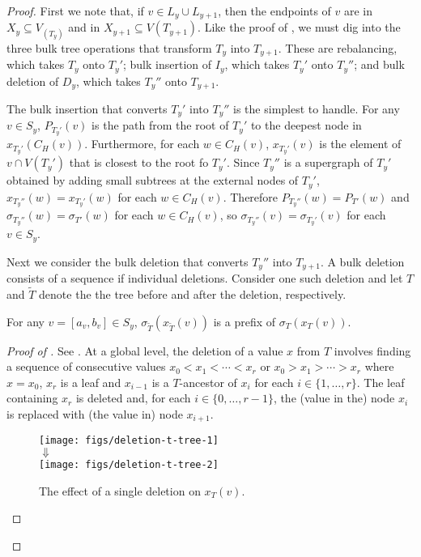 \documentclass[kpfonts]{patmorin}
\begin{document}
\begin{proof}
  First we note that, if $v\in L_y\cup L_{y+1}$, then the endpoints of $v$ are in $X_y\subseteq V_(T_y)$ and in $X_{y+1}\subseteq V(T_{y+1})$.
  Like the proof of , we must dig into the three bulk tree operations that transform $T_y$ into $T_{y+1}$. These are rebalancing, which takes $T_y$ onto $T_y'$; bulk insertion of $I_y$, which takes $T_y'$ onto $T_y''$; and bulk deletion of $D_y$, which takes $T_y''$ onto $T_{y+1}$.
  
  The bulk insertion that converts $T_y'$ into $T_y''$ is the simplest to handle.  For any $v\in S_y$, $P_{T_y'}(v)$ is the path from the root of $T_y'$ to the deepest node in $x_{T_y'}(C_H(v))$.  Furthermore, for each $w\in C_H(v)$, $x_{T_y'}(v)$ is the element of $v\cap V(T_y')$ that is closest to the root fo $T_y'$. Since $T_y''$ is a supergraph of $T_y'$ obtained by adding small subtrees at the external nodes of $T_y'$, $x_{T_y''}(w)=x_{T_y'}(w)$ for each $w\in C_H(v)$.  Therefore $P_{T_y''}(w)=P_{T'}(w)$ and $\sigma_{T_y''}(w)=\sigma_{T'}(w)$ for each $w\in C_H(v)$, so $\sigma_{T_y''}(v)=\sigma_{T_y'}(v)$ for each $v\in S_y$.
  
  Next we consider the bulk deletion that converts $T_y''$ into $T_{y+1}$.  A bulk deletion consists of a sequence if individual deletions. Consider one such deletion and let $T$ and $\tilde{T}$ denote the the tree before and after the deletion, respectively.  
  
  \begin{clm}
    For any $v=[a_v,b_v]\in S_y$, $\sigma_{\tilde{T}}(x_{\tilde{T}}(v))$ is a prefix of $\sigma_T(x_T(v))$.   
  \end{clm}
  
  \begin{proof}[Proof of ]  
    See .  At a global level, the deletion of a value $x$ from $T$ involves finding a sequence of consecutive values $x_0<x_1<\cdots<x_r$ or $x_0>x_1>\cdots>x_r$ where $x=x_0$, $x_r$ is a leaf and $x_{i-1}$ is a $T$-ancestor of $x_{i}$ for each $i\in\{1,\ldots,r\}$.  The leaf containing $x_r$ is deleted and, for each $i\in\{0,\ldots,r-1\}$, the (value in the) node $x_i$ is replaced with (the value in) node $x_{i+1}$.  

    \begin{figure}
      \begin{center}
        \texttt{[image: figs/deletion-t-tree-1]}\\[1ex]
        $\Downarrow$\\[1ex]   
        \texttt{[image: figs/deletion-t-tree-2]}   
      \end{center}
      \caption{The effect of a single deletion on $x_T(v)$.}
    \end{figure}
    

\end{proof}
\end{proof}
\end{document}
